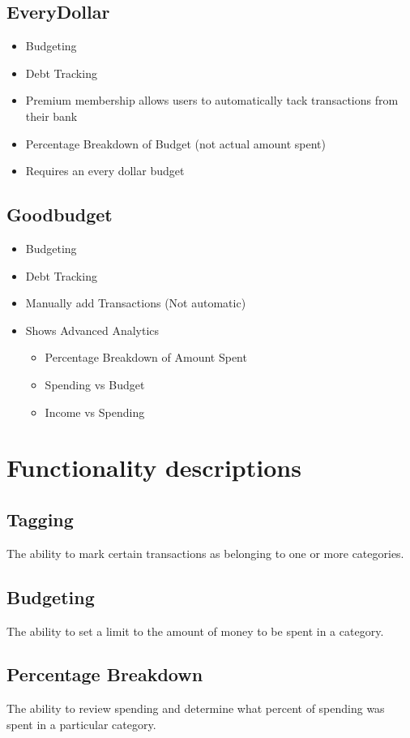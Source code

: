 \documentclass[12pt]{article}
\begin{document}
\subsection{EveryDollar}
\begin{itemize}
    \item Budgeting
    \item Debt Tracking
    \item Premium membership allows users to automatically tack transactions from their bank
    \item Percentage Breakdown of Budget (not actual amount spent)
    \item Requires an every dollar budget
\end{itemize}

\subsection{Goodbudget}
\begin{itemize}
    \item Budgeting
    \item Debt Tracking
    \item Manually add Transactions (Not automatic)
    \item Shows Advanced Analytics
    \begin{itemize}
        \item Percentage Breakdown of Amount Spent
        \item Spending vs Budget
        \item Income vs Spending
    \end{itemize}
\end{itemize}
\section{Functionality descriptions}
\subsection{Tagging}
The ability to mark certain transactions as belonging to one or more categories.
\subsection{Budgeting}
The ability to set a limit to the amount of money to be spent in a category.
\subsection{Percentage Breakdown}
The ability to review spending and determine what percent of spending was spent in a particular category.
\end{document}
